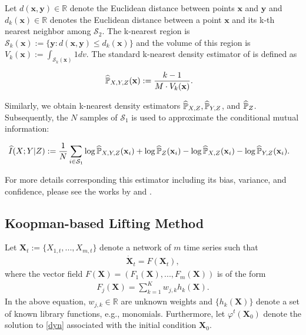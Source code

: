 Let $d(\textbf{x},\textbf{y})\in\mathbb{R}$ denote the Euclidean distance between points $\textbf{x}$ and $\textbf{y}$ and $d_k(\textbf{x})\in\mathbb{R}$ denotes the Euclidean distance between a point $\textbf{x}$ and its k-th nearest neighbor among
$\mathcal{S}_2$. The k-nearest region is $\mathcal{S}_k(\textbf{x}) := \{\textbf{y} :d(\textbf{x},\textbf{y})\leq d_k(\textbf{x}) \}$ and the volume of this region is $V_k(\textbf{x}):=\int_{\mathcal{S}_k(\textbf{x})}1dv$. The standard k-nearest density estimator of \cite{sricharan2011k} is defined as 
\begin{small}
\begin{align*}
&\widehat{\operatorname{{\mathbb{P}}}}_{X,Y,Z}(\textbf{x}):=\frac{k-1}{M\cdot V_k(\textbf{x})}.
\end{align*}
\end{small}
Similarly, we obtain k-nearest density estimators $\widehat{\operatorname{{\mathbb{P}}}}_{X,Z}, \widehat{\operatorname{{\mathbb{P}}}}_{Y,Z}$, and $\widehat{\operatorname{{\mathbb{P}}}}_{Z}$.
Subsequently, the $N$ samples of $\mathcal{S}_1$ is used to approximate the conditional mutual information:
\begin{small}
\begin{align*}
&\widehat{I}(X;Y|Z):=\frac{1}{N}\sum_{i\in \mathcal{S}_1} \log \widehat{\operatorname{{\mathbb{P}}}}_{X,Y,Z}(\textbf{x}_i) + \log \widehat{\operatorname{{\mathbb{P}}}}_{Z}(\textbf{x}_i) -\log \widehat{\operatorname{{\mathbb{P}}}}_{X,Z}(\textbf{x}_i) -\log \widehat{\operatorname{{\mathbb{P}}}}_{Y,Z}(\textbf{x}_i).
\end{align*}
\end{small}
For more details corresponding this estimator including its bias, variance, and confidence, please see the works by \cite{sricharan2011k} and \cite{loftsgaarden1965nonparametric}.


\subsection{Koopman-based Lifting Method}
Let $\textbf{X}_t:=\{X_{1,t}, ..., X_{m,t}\}$ denote a network of $m$ time series such that 
\begin{align}\label{dyn}
\dot{\textbf{X}}_t = F(\textbf{X}_t),
\end{align}
where the vector field $F(\textbf{X})=(F_1(\textbf{X}),...,F_m(\textbf{X}))$ is of the form
\begin{align}
F_j(\textbf{X})= \sum_{k=1}^K w_{j,k} h_k(\textbf{X}).
\end{align}
In the above equation, $w_{j,k}\in\mathbb{R}$ are unknown weights and $\{h_k(\textbf{X})\}$ denote a set of known library functions, e.g., monomials. 
Furthermore, let $\varphi^t(\textbf{X}_0)$ denote the solution to \eqref{dyn} associated with the initial condition $\textbf{X}_0$. 


